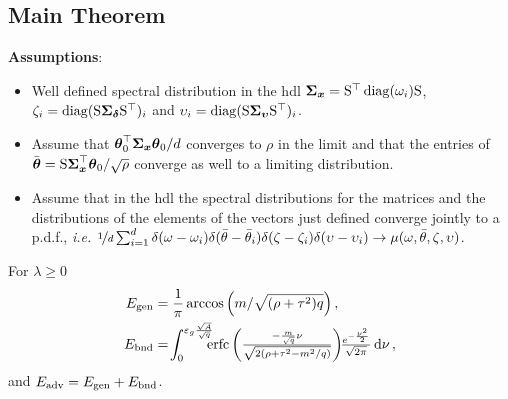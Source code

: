\documentclass[a0paper,fleqn]{betterportraitposter}
\theoremstyle{plain}
\theoremstyle{definition}
\theoremstyle{remark}
\begin{document}
{\begin{multicols}{3}
\section{Main Theorem}
\textbf{Assumptions}: 
\begin{itemize}
    \item Well defined spectral distribution in the hdl \(\boldsymbol{\Sigma}_{\boldsymbol{\boldsymbol{x}}} = \mathrm{S}^\top \operatorname{diag}(\omega_i) \mathrm{S}\), \(\zeta_i = \operatorname{diag}(\mathrm{S} \boldsymbol{\Sigma}_{\boldsymbol{\delta}} \mathrm{S}^\top)_{i}\) and \(\upsilon_i = \operatorname{diag}(\mathrm{S} \boldsymbol{\Sigma}_{\boldsymbol{\upsilon}} \mathrm{S}^\top )_i\).
    \item Assume that \(\boldsymbol{\theta}_0^\top \boldsymbol{\Sigma}_{\boldsymbol{\boldsymbol{x}}} \boldsymbol{\theta}_0 / d\) converges to \(\rho\) in the limit and that the entries of \(\bar{\boldsymbol{\theta}} = \mathrm{S} \boldsymbol{\Sigma}_{\boldsymbol{\boldsymbol{x}}}^\top \boldsymbol{\theta}_0 / \sqrt{\rho}\) converge as well to a limiting distribution.
    \item Assume that in the hdl the spectral distributions for the matrices and the distributions of the elements of the vectors just defined converge jointly to a p.d.f., \textit{i.e.} \(\nicefrac{1}{d} \sum_{i=1}^{d} \delta(\omega - \omega_i)\delta(\bar{\theta} - \bar{\theta}_i) \delta(\zeta - \zeta_i)\delta(\upsilon - \upsilon_i) \to \mu(\omega, \bar{\theta}, \zeta, \upsilon)\).
\end{itemize}


For \(\lambda \geq 0\)
\begin{align}
    E_{\mathrm{gen}} &= \frac{1}{\pi} \arccos \qty( 
    {
        m / \sqrt{ (\rho + \tau^2) q}
    } 
    ) \,, \\
    E_{\mathrm{bnd}} &= \!
    \int_{0}^{\varepsilon_g \frac{\sqrt{A}}{\sqrt{q}}} \!\!\!\!
    {\textstyle
        \operatorname*{erfc}\left( \frac{ -\frac{m}{\sqrt{q}} \nu}{\sqrt{2 \qty(\rho + \tau^2 - m^2 / q)}} \right) 
        \!\! \frac{e^{-\frac{\nu^2}{2}}}{\sqrt{2\pi}} \dd{\nu}
    }
    \label{eq:adv-error-theorem-overlap} \,, 
\end{align}
and \(E_{\mathrm{adv}} = E_{\mathrm{gen}} + E_{\mathrm{bnd}}\).


\end{multicols}}
\end{document}
